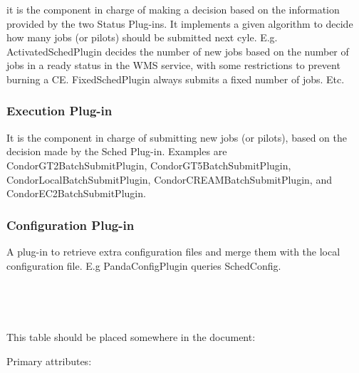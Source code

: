 \documentclass[a4paper]{jpconf}
\begin{document}
it is the component in charge of making a decision based on the information provided by the two Status Plug-ins. 
It implements a given algorithm to decide how many jobs (or pilots) should be submitted next cyle. 
E.g. ActivatedSchedPlugin decides the number of new jobs based on the number of jobs in a ready status in the WMS service, 
with some restrictions to prevent burning a CE. 
FixedSchedPlugin always submits a fixed number of jobs. Etc.

\subsubsection{Execution Plug-in} 

It is the component in charge of submitting new jobs (or pilots), 
based on the decision made by the Sched Plug-in. 
Examples are CondorGT2BatchSubmitPlugin, CondorGT5BatchSubmitPlugin, CondorLocalBatchSubmitPlugin, CondorCREAMBatchSubmitPlugin, 
and CondorEC2BatchSubmitPlugin.

\subsubsection{Configuration Plug-in} 

A plug-in to retrieve extra configuration files and merge them with the local configuration file.
E.g PandaConfigPlugin queries SchedConfig. 

~

~

This table should be placed somewhere in the document:


Primary attributes:

~
\end{document}

